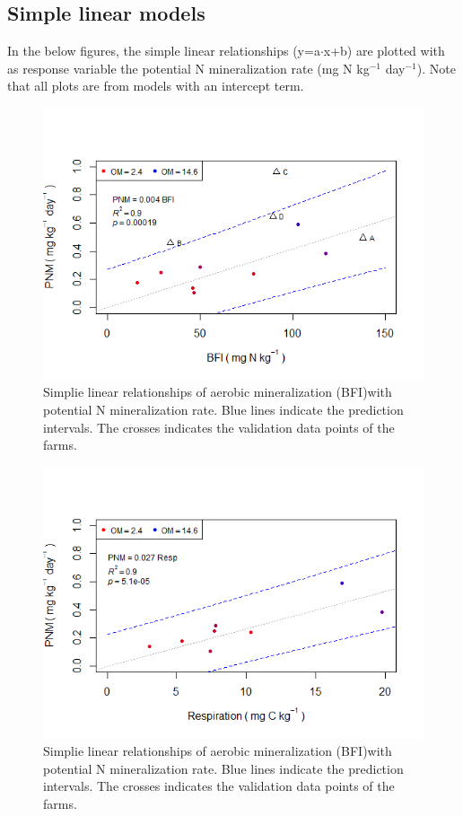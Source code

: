 \documentclass[10pt,twoside,dutch,english]{report}
\begin{document}
\begin{appendices}
  

  
\section{Simple linear models}
\label{chap: Simple linear models}
In the below figures, the simple linear relationships (y=a$\cdot$x+b) are plotted with as response variable the potential N mineralization rate (mg N kg$^{-1}$ day$^{-1}$). Note that all plots are from models with an intercept term.
\begin{figure}[H] %
\centering
	\includegraphics[width=0.75\linewidth]{app_simple_BFI}
	\caption{Simplie linear relationships of aerobic mineralization (BFI)with potential N mineralization rate.  Blue lines indicate the prediction intervals. The crosses indicates the validation data points of the farms. }
	   \end{figure}

\begin{figure}[H] %
\centering
	\includegraphics[width=0.75\linewidth]{app_simple_resp}
	\caption{Simplie linear relationships of aerobic mineralization (BFI)with potential N mineralization rate.  Blue lines indicate the prediction intervals. The crosses indicates the validation data points of the farms. }
	   \end{figure}



\end{appendices}
\end{document}

